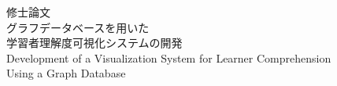 

\begin{titlepage}
\begin{center}
\vspace*{3cm}
\large
{\Huge 修\hspace{2zw}士\hspace{2zw}論\hspace{2zw}文}\\
\vspace*{3cm}
{\LARGE グラフデータベースを用いた\\学習者理解度可視化システムの開発}
\\
\vspace*{1cm}
{\large Development of a Visualization System for Learner Comprehension \\ Using a Graph Database}
\end{center}
\end{titlepage}